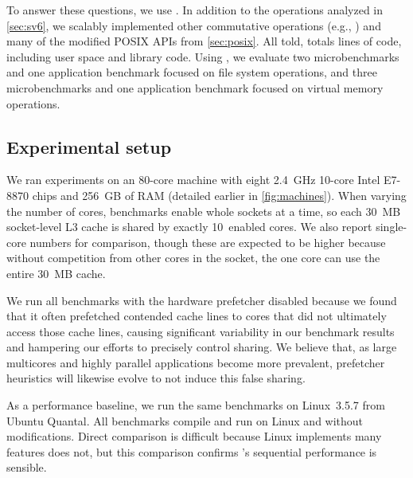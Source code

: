 To answer these questions, we use \sys.
In addition to the operations analyzed in \cref{sec:sv6}, we scalably
implemented
other commutative operations (e.g., )
and many of the modified POSIX APIs from
\cref{sec:posix}.
%
All told, \sys
totals  lines of code, including user
space and library code.
%
Using \sys, we evaluate two microbenchmarks and one application
benchmark focused on file system operations, and three microbenchmarks
and one application benchmark focused on virtual memory operations.


\subsection{Experimental setup}
\label{sec:topic:ben}


We ran experiments on an 80-core machine with eight 2.4~GHz 10-core
Intel E7-8870 chips and 256~GB of RAM (detailed earlier in
\cref{fig:machines}).
%
When varying the number of
cores, benchmarks enable whole sockets at a time, so each 30~MB
socket-level L3 cache is shared by exactly 10~enabled cores.
We also report single-core numbers for
comparison, though these are expected to be higher because without
competition from other cores in the socket, the one
core can use the entire 30~MB cache.

We run all benchmarks with the hardware prefetcher disabled because we
found that it often prefetched contended cache lines to cores that did
not ultimately access those cache lines, causing significant
variability in our benchmark results and hampering our efforts to
precisely control sharing.  We believe that, as large multicores and
highly parallel applications become more prevalent, prefetcher
heuristics will likewise evolve to not induce this false sharing.

As a performance baseline, we run the same
benchmarks on Linux~3.5.7 from Ubuntu Quantal.
%
All benchmarks compile and run on Linux and \sys without modifications.
%
Direct comparison is difficult because
Linux implements many features \sys does not, but this comparison
confirms \sys's sequential performance is sensible.

